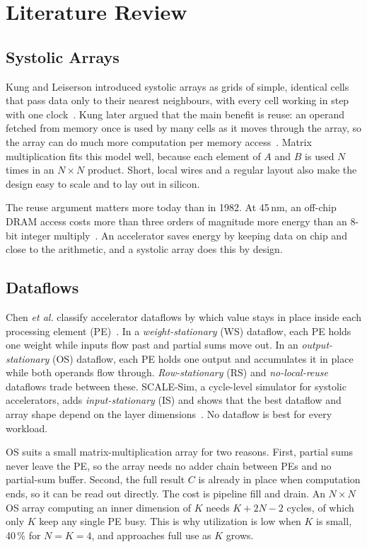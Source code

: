 
\section{Literature Review}

\subsection{Systolic Arrays}
Kung and Leiserson introduced systolic arrays as grids of simple, identical cells that pass data only to their nearest neighbours, with every cell working in step with one clock~\cite{kung1979systolic}. Kung later argued that the main benefit is reuse: an operand fetched from memory once is used by many cells as it moves through the array, so the array can do much more computation per memory access~\cite{kung1982systolic}. Matrix multiplication fits this model well, because each element of $A$ and $B$ is used $N$ times in an $N \times N$ product. Short, local wires and a regular layout also make the design easy to scale and to lay out in silicon.

The reuse argument matters more today than in 1982. At 45\,nm, an off-chip DRAM access costs more than three orders of magnitude more energy than an 8-bit integer multiply~\cite{horowitz2014energy}. An accelerator saves energy by keeping data on chip and close to the arithmetic, and a systolic array does this by design.

\subsection{Dataflows}
Chen \emph{et al.} classify accelerator dataflows by which value stays in place inside each processing element (PE)~\cite{chen2016eyeriss, sze2017efficient}. In a \emph{weight-stationary} (WS) dataflow, each PE holds one weight while inputs flow past and partial sums move out. In an \emph{output-stationary} (OS) dataflow, each PE holds one output and accumulates it in place while both operands flow through. \emph{Row-stationary} (RS) and \emph{no-local-reuse} dataflows trade between these. SCALE-Sim, a cycle-level simulator for systolic accelerators, adds \emph{input-stationary} (IS) and shows that the best dataflow and array shape depend on the layer dimensions~\cite{samajdar2020scalesim}. No dataflow is best for every workload.

OS suits a small matrix-multiplication array for two reasons. First, partial sums never leave the PE, so the array needs no adder chain between PEs and no partial-sum buffer. Second, the full result $C$ is already in place when computation ends, so it can be read out directly. The cost is pipeline fill and drain. An $N \times N$ OS array computing an inner dimension of $K$ needs $K + 2N - 2$ cycles, of which only $K$ keep any single PE busy. This is why utilization is low when $K$ is small, 40\,\% for $N = K = 4$, and approaches full use as $K$ grows.

